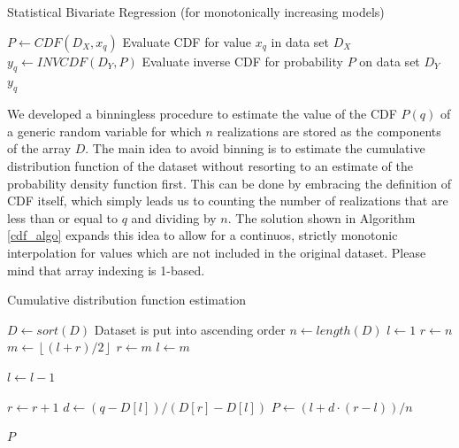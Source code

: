 \documentclass[10pt,final]{siamltex}
\begin{document}
\begin{algorithm}
  \caption{Statistical Bivariate Regression (for monotonically increasing models)}
  \label{regression_algo}
  \begin{algorithmic}[1]
    \State $P \gets CDF(D_X, x_q)$
    \Comment Evaluate CDF for value $x_q$ in data set $D_X$
    \State $y_q \gets INVCDF(D_Y, P)$
    \Comment Evaluate inverse CDF for probability $P$ on data set $D_Y$
    \State \Return $y_q$
    \EndFunction
  \end{algorithmic}
\end{algorithm}
%

We developed a binningless procedure to estimate the value of the CDF $P(q)$ of a generic random variable for which $n$ realizations are stored as the components of the array $D$.
The main idea to avoid binning is to estimate the cumulative distribution function of the dataset without resorting to an estimate of the probability density function first. This can be done by embracing the definition of CDF itself, which simply leads us to counting the number of realizations that are less than or equal to $q$ and dividing by $n$. The solution shown in Algorithm \ref{cdf_algo} expands this idea to allow for a continuos, strictly monotonic interpolation for values which are not included in the original dataset. Please mind that array indexing is 1-based.

\begin{algorithm}
  \caption{Cumulative distribution function estimation}
  \label{cdf_algo}
  \begin{algorithmic}[1]
    \State $D \gets sort(D)$
    \Comment Dataset is put into ascending order
    \State $n \gets length(D)$
    \State $l \gets 1$
    \State $r \gets n$
    \State $m \gets \left \lfloor{(l+r)/2}\right \rfloor$
    \State $r \gets m$
    \Else
    \State $l \gets m$
    \EndIf
    \EndWhile


    \State $l \gets l - 1$
    \EndWhile

    \State $r \gets r + 1$
    \EndWhile
    \State $d \gets (q-D[l])/(D[r]-D[l])$
    \State $P \gets (l + d \cdot (r - l))/n $

    \EndIf

    \State \Return $P$
    \EndFunction
  \end{algorithmic}
\end{algorithm}
\end{document}
